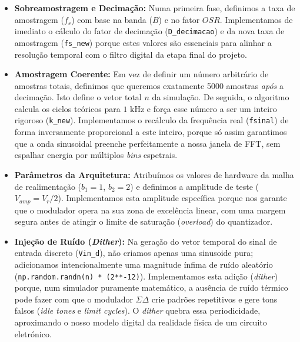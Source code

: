 \begin{itemize}
    \item \textbf{Sobreamostragem e Decimação:} Numa primeira fase, definimos a taxa de amostragem ($f_s$)
    com base na banda ($B$) e no fator $OSR$. Implementamos de imediato o cálculo do fator de decimação
    (\texttt{D\_decimacao}) e da nova taxa de amostragem (\texttt{fs\_new}) porque estes valores são
    essenciais para alinhar a resolução temporal com o filtro digital da etapa final do projeto.
    \vspace{0.2cm}
    \item \textbf{Amostragem Coerente:} Em vez de definir um número arbitrário de amostras totais,
    definimos que queremos exatamente 5000 amostras \textit{após} a decimação. Isto define o vetor total
    $n$ da simulação. De seguida, o algoritmo calcula os ciclos teóricos para $1\text{ kHz}$ e força esse
    número a ser um inteiro rigoroso (\texttt{k\_new}). Implementamos o recálculo da frequência real
    (\texttt{fsinal}) de forma inversamente proporcional a este inteiro, porque só assim garantimos que
    a onda sinusoidal preenche perfeitamente a nossa janela de FFT, sem espalhar energia por múltiplos
    \textit{bins} espetrais.
    \vspace{0.2cm}
    \item \textbf{Parâmetros da Arquitetura:} Atribuímos os valores de hardware da malha de realimentação
    ($b_1 = 1$, $b_2 = 2$) e definimos a amplitude de teste ($V_{amp} = V_r / 2$). Implementamos esta
    amplitude específica porque nos garante que o modulador opera na sua zona de excelência linear, com
    uma margem segura antes de atingir o limite de saturação (\textit{overload}) do quantizador.
    \vspace{0.2cm}
    \item \textbf{Injeção de Ruído (\textit{Dither}):} Na geração do vetor temporal do sinal de entrada
    discreto (\texttt{Vin\_d}), não criamos apenas uma sinusoide pura; adicionamos intencionalmente uma
    magnitude ínfima de ruído aleatório (\texttt{np.random.randn(n) * (2**-12)}). Implementamos esta adição
    (\textit{dither}) porque, num simulador puramente matemático, a ausência de ruído térmico pode fazer
    com que o modulador $\Sigma\Delta$ crie padrões repetitivos e gere tons falsos (\textit{idle tones} e
    \textit{limit cycles}). O \textit{dither} quebra essa periodicidade, aproximando o nosso modelo digital
    da realidade física de um circuito eletrónico.
\end{itemize}


